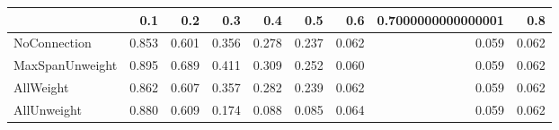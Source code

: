 \begin{tabular}{lrrrrrrrr}
\toprule
{} &   0.1 &   0.2 &   0.3 &   0.4 &   0.5 &   0.6 & 0.7000000000000001 &   0.8 \\
\midrule
NoConnection    & 0.853 & 0.601 & 0.356 & 0.278 & 0.237 & 0.062 &              0.059 & 0.062 \\
MaxSpanUnweight & 0.895 & 0.689 & 0.411 & 0.309 & 0.252 & 0.060 &              0.059 & 0.062 \\
AllWeight       & 0.862 & 0.607 & 0.357 & 0.282 & 0.239 & 0.062 &              0.059 & 0.062 \\
AllUnweight     & 0.880 & 0.609 & 0.174 & 0.088 & 0.085 & 0.064 &              0.059 & 0.062 \\
\bottomrule
\end{tabular}

